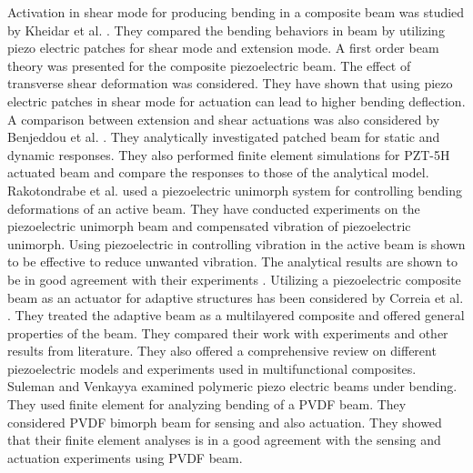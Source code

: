 Activation in shear mode for producing bending in a composite beam was studied by Kheidar et al. \cite{khdeir2001deflection}.
They compared the bending behaviors in beam by utilizing piezo electric patches for shear mode and extension mode.  
A first order beam theory was presented for the composite piezoelectric beam. 
The effect of transverse shear deformation was considered.
They have shown that using piezo electric patches in shear mode for actuation can lead to higher bending deflection. 
A comparison between extension and shear actuations was also considered by Benjeddou et al. \cite{benjeddou1999new}.
They analytically investigated patched beam for static and dynamic responses.
They also performed finite element simulations for PZT-5H actuated beam and compare the responses to those of the analytical model. 
Rakotondrabe et al. \cite{rakotondrabe2006plurilinear} used a piezoelectric unimorph system for controlling bending deformations of an active beam.
They have conducted experiments on the piezoelectric unimorph beam and compensated vibration of piezoelectric unimorph.
Using piezoelectric in controlling vibration in the active beam is shown to be effective to reduce unwanted vibration.
The analytical results are shown to be in good agreement with their experiments \cite{rakotondrabe2008hysteresis}.  
Utilizing a piezoelectric composite beam as an actuator for adaptive structures has been considered by Correia et al. \cite{franco2000modelling}.
They treated the adaptive beam as a multilayered composite and offered general properties of the beam.
They compared their work with experiments and other results from literature.
They also offered a comprehensive review on different piezoelectric models and experiments used in multifunctional composites.
Suleman and Venkayya \cite{suleman1995simple} examined polymeric piezo electric beams under bending. 
They used finite element for analyzing bending of a PVDF beam.
They considered PVDF bimorph beam for sensing and also actuation.
They showed that their finite element analyses is in a good agreement with the sensing and actuation experiments using PVDF beam. \\

